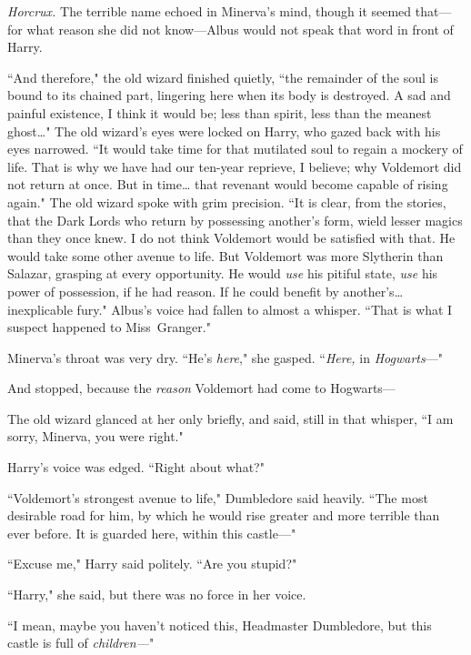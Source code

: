 \emph{Horcrux.} The terrible name echoed in Minerva's mind, though it seemed that—for what reason she did not know—Albus would not speak that word in front of Harry.

``And therefore," the old wizard finished quietly, ``the remainder of the soul is bound to its chained part, lingering here when its body is destroyed. A sad and painful existence, I think it would be; less than spirit, less than the meanest ghost{\ldots}" The old wizard's eyes were locked on Harry, who gazed back with his eyes narrowed. ``It would take time for that mutilated soul to regain a mockery of life. That is why we have had our ten-year reprieve, I believe; why Voldemort did not return at once. But in time{\ldots} that revenant would become capable of rising again." The old wizard spoke with grim precision. ``It is clear, from the stories, that the Dark Lords who return by possessing another's form, wield lesser magics than they once knew. I do not think Voldemort would be satisfied with that. He would take some other avenue to life. But Voldemort was more Slytherin than Salazar, grasping at every opportunity. He would \emph{use} his pitiful state, \emph{use} his power of possession, if he had reason. If he could benefit by another's{\ldots} inexplicable fury." Albus's voice had fallen to almost a whisper. ``That is what I suspect happened to Miss~Granger."

Minerva's throat was very dry. ``He's \emph{here}," she gasped. ``\emph{Here,} in \emph{Hogwarts}—"

And stopped, because the \emph{reason} Voldemort had come to Hogwarts—

The old wizard glanced at her only briefly, and said, still in that whisper, ``I am sorry, Minerva, you were right."

Harry's voice was edged. ``Right about what?"

``Voldemort's strongest avenue to life," Dumbledore said heavily. ``The most desirable road for him, by which he would rise greater and more terrible than ever before. It is guarded here, within this castle—"

``Excuse me," Harry said politely. ``Are you stupid?"

``Harry," she said, but there was no force in her voice.

``I mean, maybe you haven't noticed this, Headmaster Dumbledore, but this castle is full of \emph{children—}"

